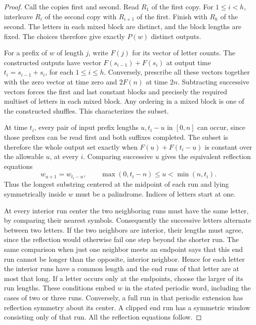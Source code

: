 \documentclass[11pt,letterpaper]{article}
\begin{document}
\begin{proof}
Call the copies first and second. Read \(R_1\) of the first copy. For \(1\le i<h\), interleave \(R_i\) of the second copy with \(R_{i+1}\) of the first. Finish with \(R_h\) of the second. The letters in each mixed block are distinct, and the block lengths are fixed. The choices therefore give exactly \(P(w)\) distinct outputs.

For a prefix of \(w\) of length \(j\), write \(F(j)\) for its vector of letter counts. The constructed outputs have vector \(F(s_{i-1})+F(s_i)\) at output time \(t_i=s_{i-1}+s_i\), for each \(1\le i\le h\). Conversely, prescribe all these vectors together with the zero vector at time zero and \(2F(n)\) at time \(2n\). Subtracting successive vectors forces the first and last constant blocks and precisely the required multiset of letters in each mixed block. Any ordering in a mixed block is one of the constructed shuffles. This characterizes the subset.

At time \(t_i\), every pair of input prefix lengths \(u,t_i-u\) in \([0,n]\) can occur, since those prefixes can be read first and both suffixes completed. The subset is therefore the whole output set exactly when \(F(u)+F(t_i-u)\) is constant over the allowable \(u\), at every \(i\). Comparing successive \(u\) gives the equivalent reflection equations
\[
 w_{u+1}=w_{t_i-u},\qquad
 \max(0,t_i-n)\le u<\min(n,t_i).
\]
Thus the longest substring centered at the midpoint of each run and lying symmetrically inside \(w\) must be a palindrome. Indices of letters start at one.

At every interior run center the two neighboring runs must have the same letter, by comparing their nearest symbols. Consequently the successive letters alternate between two letters. If the two neighbors are interior, their lengths must agree, since the reflection would otherwise fail one step beyond the shorter run. The same comparison when just one neighbor meets an endpoint says that this end run cannot be longer than the opposite, interior neighbor. Hence for each letter the interior runs have a common length and the end runs of that letter are at most that long. If a letter occurs only at the endpoints, choose the larger of its run lengths. These conditions embed \(w\) in the stated periodic word, including the cases of two or three runs. Conversely, a full run in that periodic extension has reflection symmetry about its center. A clipped end run has a symmetric window consisting only of that run. All the reflection equations follow.
\end{proof}
\end{document}
